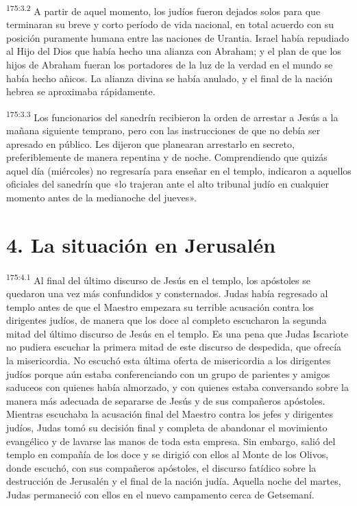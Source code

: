 \par 
\textsuperscript{175:3.2} A partir de aquel momento, los judíos fueron dejados solos para que terminaran su breve y corto período de vida nacional, en total acuerdo con su posición puramente humana entre las naciones de Urantia. Israel había repudiado al Hijo del Dios que había hecho una alianza con Abraham; y el plan de que los hijos de Abraham fueran los portadores de la luz de la verdad en el mundo se había hecho añicos. La alianza divina se había anulado, y el final de la nación hebrea se aproximaba rápidamente.

\par 
\textsuperscript{175:3.3} Los funcionarios del sanedrín recibieron la orden de arrestar a Jesús a la mañana siguiente temprano, pero con las instrucciones de que no debía ser apresado en público. Les dijeron que planearan arrestarlo en secreto, preferiblemente de manera repentina y de noche. Comprendiendo que quizás aquel día (miércoles) no regresaría para enseñar en el templo, indicaron a aquellos oficiales del sanedrín que «lo trajeran ante el alto tribunal judío en cualquier momento antes de la medianoche del jueves».

\section*{4. La situación en Jerusalén}
\par 
\textsuperscript{175:4.1} Al final del último discurso de Jesús en el templo, los apóstoles se quedaron una vez más confundidos y consternados. Judas había regresado al templo antes de que el Maestro empezara su terrible acusación contra los dirigentes judíos, de manera que los doce al completo escucharon la segunda mitad del último discurso de Jesús en el templo. Es una pena que Judas Iscariote no pudiera escuchar la primera mitad de este discurso de despedida, que ofrecía la misericordia. No escuchó esta última oferta de misericordia a los dirigentes judíos porque aún estaba conferenciando con un grupo de parientes y amigos saduceos con quienes había almorzado, y con quienes estaba conversando sobre la manera más adecuada de separarse de Jesús y de sus compañeros apóstoles. Mientras escuchaba la acusación final del Maestro contra los jefes y dirigentes judíos, Judas tomó su decisión final y completa de abandonar el movimiento evangélico y de lavarse las manos de toda esta empresa. Sin embargo, salió del templo en compañía de los doce y se dirigió con ellos al Monte de los Olivos, donde escuchó, con sus compañeros apóstoles, el discurso fatídico sobre la destrucción de Jerusalén y el final de la nación judía. Aquella noche del martes, Judas permaneció con ellos en el nuevo campamento cerca de Getsemaní.

